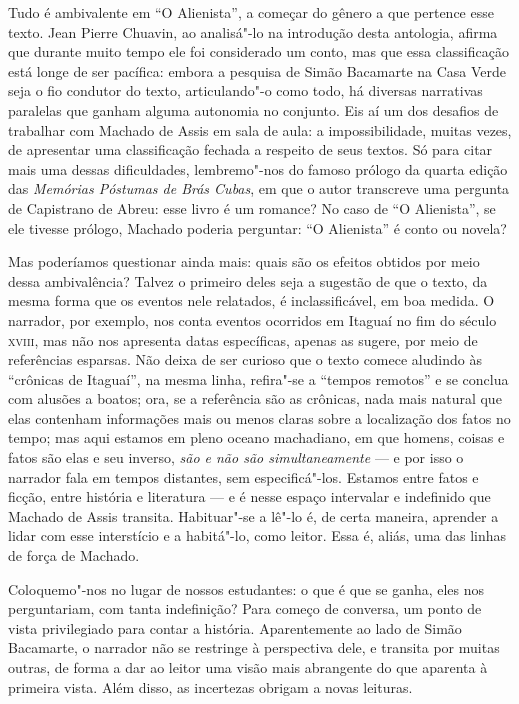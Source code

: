 Tudo é ambivalente em ``O Alienista'', a começar do gênero a que
pertence esse texto. Jean Pierre Chuavin, ao analisá"-lo na introdução
desta antologia, afirma que durante muito tempo ele foi considerado um
conto, mas que essa classificação está longe de ser pacífica: embora a
pesquisa de Simão Bacamarte na Casa Verde seja o fio condutor do texto,
articulando"-o como todo, há diversas narrativas paralelas que ganham
alguma autonomia no conjunto. Eis aí um dos desafios de trabalhar com
Machado de Assis em sala de aula: a impossibilidade, muitas vezes, de
apresentar uma classificação fechada a respeito de seus textos. Só para
citar mais uma dessas dificuldades, lembremo"-nos do famoso prólogo da
quarta edição das \emph{Memórias Póstumas de Brás Cubas}, em que o autor
transcreve uma pergunta de Capistrano de Abreu: esse livro é um romance?
No caso de ``O Alienista'', se ele tivesse prólogo, Machado poderia
perguntar: ``O Alienista'' é conto ou novela?

Mas poderíamos questionar ainda mais: quais são os efeitos obtidos por
meio dessa ambivalência? Talvez o primeiro deles seja a sugestão de que
o texto, da mesma forma que os eventos nele relatados, é
inclassificável, em boa medida. O narrador, por exemplo, nos conta
eventos ocorridos em Itaguaí no fim do século \textsc{xviii}, mas não nos
apresenta datas específicas, apenas as sugere, por meio de referências
esparsas. Não deixa de ser curioso que o texto comece aludindo às
``crônicas de Itaguaí'', na mesma linha, refira"-se a ``tempos remotos''
e se conclua com alusões a boatos; ora, se a referência são as crônicas,
nada mais natural que elas contenham informações mais ou menos claras
sobre a localização dos fatos no tempo; mas aqui estamos em pleno oceano
machadiano, em que homens, coisas e fatos são elas e seu inverso,
\emph{são e não são simultaneamente} --- e por isso o narrador fala em
tempos distantes, sem especificá"-los. Estamos entre fatos e ficção,
entre história e literatura --- e é nesse espaço intervalar e indefinido
que Machado de Assis transita. Habituar"-se a lê"-lo é, de certa maneira,
aprender a lidar com esse interstício e a habitá"-lo, como leitor. Essa
é, aliás, uma das linhas de força de Machado.

Coloquemo"-nos no lugar de nossos estudantes: o que é que se ganha, eles
nos perguntariam, com tanta indefinição? Para começo de conversa, um
ponto de vista privilegiado para contar a história. Aparentemente ao
lado de Simão Bacamarte, o narrador não se restringe à perspectiva dele,
e transita por muitas outras, de forma a dar ao leitor uma visão mais
abrangente do que aparenta à primeira vista. Além disso, as incertezas
obrigam a novas leituras.

